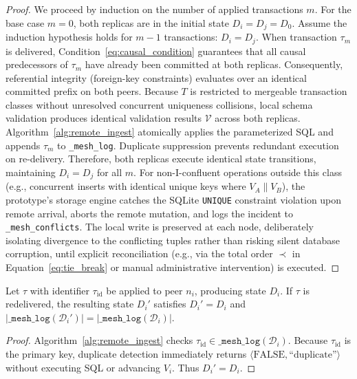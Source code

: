 \begin{proof}
We proceed by induction on the number of applied transactions $m$. For the base case $m = 0$, both replicas are in the initial state $D_i = D_j = D_0$. Assume the induction hypothesis holds for $m-1$ transactions: $D_i = D_j$. When transaction $\tau_m$ is delivered, Condition~\eqref{eq:causal_condition} guarantees that all causal predecessors of $\tau_m$ have already been committed at both replicas. Consequently, referential integrity (foreign-key constraints) evaluates over an identical committed prefix on both peers. Because $T$ is restricted to mergeable transaction classes without unresolved concurrent uniqueness collisions, local schema validation produces identical validation results $\mathcal{V}$ across both replicas. Algorithm~\ref{alg:remote_ingest} atomically applies the parameterized SQL and appends $\tau_m$ to \texttt{\_mesh\_log}. Duplicate suppression prevents redundant execution on re-delivery. Therefore, both replicas execute identical state transitions, maintaining $D_i = D_j$ for all $m$.
For non-I-confluent operations outside this class (e.g., concurrent inserts with identical unique keys where $V_A \parallel V_B$), the prototype's storage engine catches the SQLite \texttt{UNIQUE} constraint violation upon remote arrival, aborts the remote mutation, and logs the incident to \texttt{\_mesh\_conflicts}. The local write is preserved at each node, deliberately isolating divergence to the conflicting tuples rather than risking silent database corruption, until explicit reconciliation (e.g., via the total order $\prec$ in Equation~\eqref{eq:tie_break} or manual administrative intervention) is executed.
\end{proof}

\begin{proposition}
\label{prop:idempotent}
Let $\tau$ with identifier $\tau_{\text{id}}$ be applied to peer $n_i$, producing state $D_i$. If $\tau$ is redelivered, the resulting state $D_i'$ satisfies $D_i' = D_i$ and $|\texttt{\_mesh\_log}(\mathcal{D}_i')| = |\texttt{\_mesh\_log}(\mathcal{D}_i)|$.
\end{proposition}

\begin{proof}
Algorithm~\ref{alg:remote_ingest} checks $\tau_{\text{id}} \in \texttt{\_mesh\_log}(\mathcal{D}_i)$. Because $\tau_{\text{id}}$ is the primary key, duplicate detection immediately returns $\langle \text{FALSE}, \text{``duplicate''} \rangle$ without executing SQL or advancing $V_i$. Thus $D_i' = D_i$.
\end{proof}

